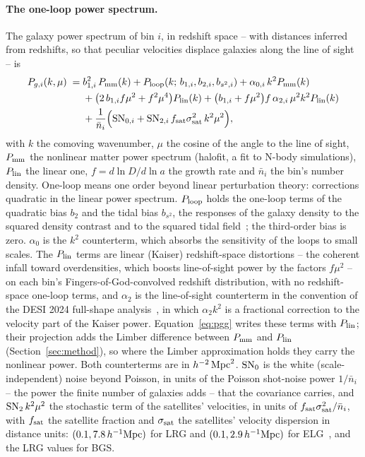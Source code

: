 \documentclass[11pt]{article}
\newcommand{\bstwo}{b_{s^2}}
\newcommand{\SNz}{{\rm SN}_0}
\newcommand{\SNt}{{\rm SN}_2}
\newcommand{\fsat}{0.1}
\newcommand{\ssatLRG}{7.8}
\newcommand{\ssatELG}{2.9}
\begin{document}
\paragraph{The one-loop power spectrum.}
The galaxy power spectrum of bin $i$, in redshift space -- with
distances inferred from redshifts, so that peculiar velocities
displace galaxies along the line of sight -- is
\begin{align}
  P_{g,i}(k, \mu) \;={}& b_{1,i}^2\,P_{\rm mm}(k)
  + P_{\rm loop}(k;\, b_{1,i}, b_{2,i}, b_{s^2,i})
  + \alpha_{0,i}\,k^2 P_{\rm mm}(k)
  \nonumber\\
  &+ \bigl(2\,b_{1,i} f\mu^2 + f^2\mu^4\bigr) P_{\rm lin}(k)
  + \bigl(b_{1,i} + f\mu^2\bigr) f\,\alpha_{2,i}\,\mu^2 k^2
    P_{\rm lin}(k)
  \nonumber\\
  &+ \frac{1}{\bar{n}_i}\Bigl({\rm SN}_{0,i}
  + {\rm SN}_{2,i}\,f_{\rm sat}\sigma_{\rm sat}^2\,k^2\mu^2\Bigr) ,
  \label{eq:pgg}
\end{align}
with $k$ the comoving wavenumber, $\mu$ the cosine of the angle to the
line of sight, $P_{\rm mm}$ the nonlinear matter power
spectrum (halofit, a fit to N-body simulations), $P_{\rm lin}$ the
linear one, $f = d\ln D/d\ln a$ the growth
rate and $\bar{n}_i$ the bin's number density.  One-loop means one
order beyond linear perturbation theory: corrections quadratic in the
linear power spectrum.  $P_{\rm loop}$ holds
the one-loop terms of the quadratic bias $b_2$ and the tidal bias
$\bstwo$, the responses of the galaxy density to the squared density
contrast and to the squared tidal field~\cite{McDonaldRoy2009,Saito2014};
the third-order bias is zero.  $\alpha_0$ is the $k^2$ counterterm,
which absorbs the sensitivity of the loops to small scales.  The
$P_{\rm lin}$ terms are linear (Kaiser) redshift-space distortions --
the coherent infall toward overdensities, which boosts line-of-sight
power by the factors $f\mu^2$ -- on each bin's
Fingers-of-God-convolved redshift distribution, with no
redshift-space one-loop terms, and $\alpha_2$ is the line-of-sight
counterterm in the convention of the DESI 2024 full-shape
analysis~\cite{Maus2024}, in which $\alpha_2 k^2$ is a fractional
correction to the velocity part of the Kaiser power.  Equation~\eqref{eq:pgg}
writes these terms with $P_{\rm lin}$; their projection adds the Limber
difference between $P_{\rm mm}$ and $P_{\rm lin}$ (Section~\ref{sec:method}),
so where the Limber approximation holds they carry the nonlinear power.
Both counterterms are in $h^{-2}\,{\rm Mpc}^2$.  $\SNz$ is the white
(scale-independent) noise beyond Poisson, in units of the Poisson
shot-noise power $1/\bar{n}_i$ -- the power the finite number of
galaxies adds -- that the covariance carries, and $\SNt\,k^2\mu^2$ the stochastic term of the
satellites' velocities, in units of $f_{\rm sat}\sigma_{\rm
sat}^2/\bar{n}_i$, with $f_{\rm sat}$ the satellite fraction and
$\sigma_{\rm sat}$ the satellites' velocity dispersion in distance
units: $(\fsat, \ssatLRG\,h^{-1}{\rm Mpc})$ for LRG and
$(\fsat, \ssatELG\,h^{-1}{\rm Mpc})$ for ELG~\cite{Maus2024}, and the
LRG values for BGS.
\end{document}
